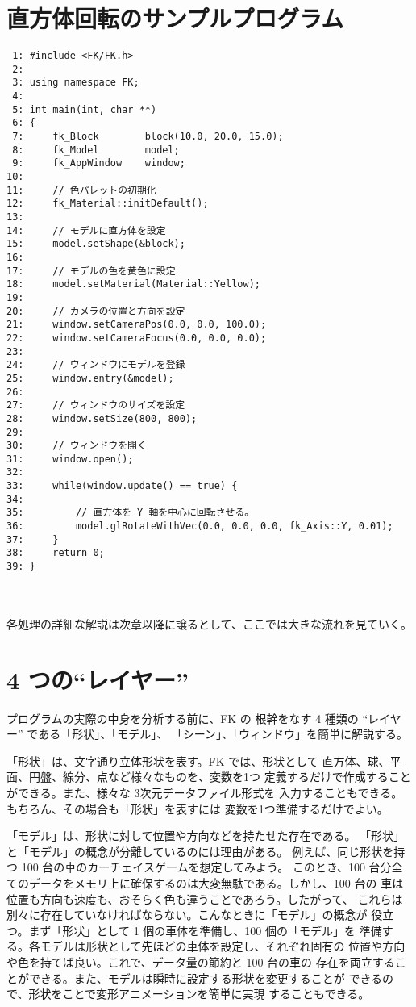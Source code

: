 \section{直方体回転のサンプルプログラム}
\begin{breakbox}
\begin{small}
\begin{verbatim}
 1: #include <FK/FK.h>
 2: 
 3: using namespace FK;
 4: 
 5: int main(int, char **)
 6: {
 7:     fk_Block        block(10.0, 20.0, 15.0);
 8:     fk_Model        model;
 9:     fk_AppWindow    window;
10: 
11:     // 色パレットの初期化
12:     fk_Material::initDefault();          
13: 
14:     // モデルに直方体を設定
15:     model.setShape(&block);
16: 
17:     // モデルの色を黄色に設定
18:     model.setMaterial(Material::Yellow);
19: 
20:     // カメラの位置と方向を設定
21:     window.setCameraPos(0.0, 0.0, 100.0);
22:     window.setCameraFocus(0.0, 0.0, 0.0);
23: 
24:     // ウィンドウにモデルを登録
25:     window.entry(&model);
26: 
27:     // ウィンドウのサイズを設定
28:     window.setSize(800, 800);
29: 
30:     // ウィンドウを開く
31:     window.open();
32: 
33:     while(window.update() == true) {
34: 
35:         // 直方体を Y 軸を中心に回転させる。
36:         model.glRotateWithVec(0.0, 0.0, 0.0, fk_Axis::Y, 0.01);
37:     }
38:     return 0;
39: }
\end{verbatim}
\end{small}
\end{breakbox}

~ \\ ~ \\
各処理の詳細な解説は次章以降に譲るとして、ここでは大きな流れを見ていく。

\section{4 つの``レイヤー''}
プログラムの実際の中身を分析する前に、FK の
根幹をなす 4 種類の ``レイヤー'' である「形状」、「モデル」、
「シーン」、「ウィンドウ」を簡単に解説する。

「形状」は、文字通り立体形状を表す。FK では、形状として
直方体、球、平面、円盤、線分、点など様々なものを、変数を1つ
定義するだけで作成することができる。また、様々な 3次元データファイル形式を
入力することもできる。もちろん、その場合も「形状」を表すには
変数を1つ準備するだけでよい。

「モデル」は、形状に対して位置や方向などを持たせた存在である。
「形状」と「モデル」の概念が分離しているのには理由がある。
例えば、同じ形状を持つ 100 台の車のカーチェイスゲームを想定してみよう。
このとき、100 台分全てのデータをメモリ上に確保するのは大変無駄である。しかし、100 台の
車は位置も方向も速度も、おそらく色も違うことであろう。したがって、
これらは別々に存在していなければならない。こんなときに「モデル」の概念が
役立つ。まず「形状」として 1 個の車体を準備し、100 個の「モデル」を
準備する。各モデルは形状として先ほどの車体を設定し、それぞれ固有の
位置や方向や色を持てば良い。これで、データ量の節約と 100 台の車の
存在を両立することができる。また、モデルは瞬時に設定する形状を変更することが
できるので、形状をことで変形アニメーションを簡単に実現
することもできる。

